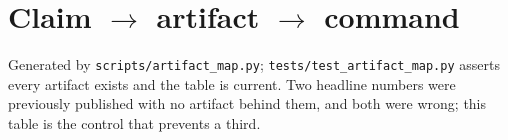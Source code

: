 \documentclass[sigconf,nonacm]{acmart}
\begin{document}
{\scriptsize}



\section{Claim $\to$ artifact $\to$ command}
\label{app:map}

Generated by \texttt{scripts/artifact\_map.py};
\texttt{tests/test\_artifact\_map.py} asserts every artifact exists and the
table is current. Two headline numbers were previously published with no
artifact behind them, and both were wrong; this table is the control that
prevents a third.

\begin{table}[p]
\caption{Every load-bearing claim, the artifact it traces to, and the command
that regenerates it.}
\label{tab:map}
\scriptsize

\end{table}
\end{document}
